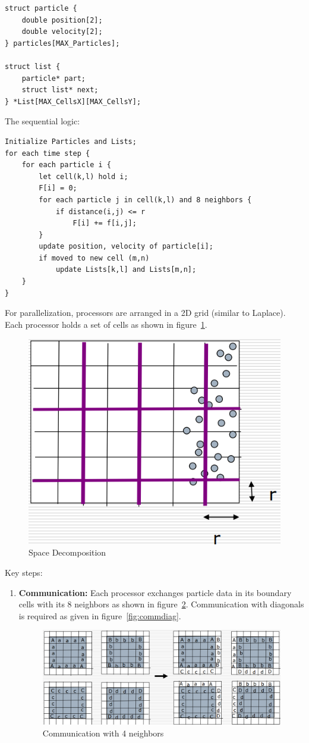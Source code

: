 \documentclass[12pt]{book}
\begin{document}
\begin{itemize}
\begin{lstlisting}[style=cppstyle]
struct particle {
    double position[2];
    double velocity[2];
} particles[MAX_Particles];

struct list {
    particle* part;
    struct list* next;
} *List[MAX_CellsX][MAX_CellsY];
    \end{lstlisting}

    The sequential logic:
    \begin{lstlisting}[style=cppstyle]
Initialize Particles and Lists;
for each time step {
    for each particle i {
        let cell(k,l) hold i;
        F[i] = 0;
        for each particle j in cell(k,l) and 8 neighbors {
            if distance(i,j) <= r
                F[i] += f[i,j];
        }
        update position, velocity of particle[i];
        if moved to new cell (m,n)
            update Lists[k,l] and Lists[m,n];
    }
}
    \end{lstlisting}

    For parallelization, processors are arranged in a 2D grid (similar to Laplace). Each processor holds a set of cells as shown in figure~\ref{fig:spacedecomp1}. 
\begin{figure}[ht]
        \centering
        \includegraphics[width=0.5\linewidth]{images/spacedecomp1.png}
        \caption{Space Decomposition}
        \label{fig:spacedecomp1}
    \end{figure}
        Key steps:
    \begin{enumerate}
        \item \textbf{Communication:} Each processor exchanges particle data in its boundary cells with its $8$ neighbors as shown in figure~\ref{fig:comms1}. Communication with diagonals is required as given in figure~\ref{fig:commdiag}.
        \begin{figure}
            \centering
            \includegraphics[width=0.75\linewidth]{images/communications1.png}
            \caption{Communication with 4 neighbors}
            \label{fig:comms1}
        \end{figure}


\end{enumerate}
\end{itemize}
\end{document}
